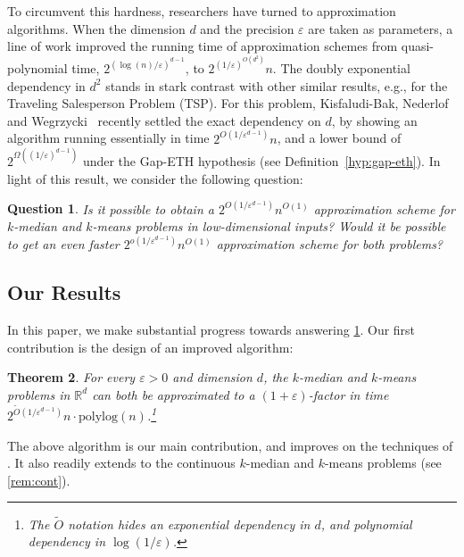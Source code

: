 \documentclass[11pt]{article}
\newtheorem{theorem}{Theorem}[section]
\newtheorem{question}[theorem]{Question}
\newcommand{\R}{\mathbb R}
\newcommand{\eps}{\varepsilon}
\newcommand{\polylog}{\mathrm{ polylog}}
\renewcommand{\tilde}{\widetilde}
\newcommand{\lpar}{\left(}
\newcommand{\rpar}{\right)}
\begin{document}
To circumvent this hardness, researchers have turned to approximation algorithms. When the dimension $d$ and the precision $\eps$ are taken as parameters, a line of work \cite{AroraRR98, KolliopoulosR07, FriggstadRS19, Cohen-AddadKM19, Cohen-Addad18, jacm} improved the running time of approximation schemes from quasi-polynomial time, $2^{(\log(n)/\eps)^{d-1}}$, to  $2^{(1/\eps)^{O(d^2)}} n$. 
The doubly exponential dependency in $d^2$ stands in stark contrast with other similar results, e.g., for the Traveling Salesperson Problem (TSP). 
For this problem, Kisfaludi-Bak, Nederlof and Wegrzycki~\cite{Kisfaludi-BakNW21} recently settled the exact dependency on $d$, by showing an algorithm running essentially in time $2^{O\lpar 1/\eps^{d-1}\rpar} n$, and a lower bound of $2^{\Omega\lpar (1/\eps)^{d-1}\rpar}$ under the Gap-ETH hypothesis \cite{D16,MR16} (see Definition~\ref{hyp:gap-eth}). 
In light of this result, we consider the following question:


\begin{question}\label{q:approx}
Is it possible to obtain a $2^{O\lpar 1/\eps^{d-1}\rpar} n^{O(1)}$ approximation scheme for $k$-median and $k$-means problems in low-dimensional inputs? Would it be possible to get an even faster $2^{o\lpar 1/\eps^{d-1}\rpar} n^{O(1)}$ approximation scheme for both problems?
\end{question}



\subsection{Our Results}
In this paper, we make substantial progress towards answering \cref{q:approx}. Our first contribution is the design of an improved algorithm:

\begin{theorem}\label{thm:mainAlgo}
    For every $\eps > 0$ and dimension $d$, the $k$-median and $k$-means problems in $\R^d$ can both be  approximated to a $(1+\eps)$-factor in time $2^{\tilde O\lpar 1/\eps^{d-1}\rpar} n \cdot \polylog(n)$.\footnote{The $\tilde O$ notation hides an exponential dependency in $d$, and polynomial dependency in $\log(1/\eps)$.}
\end{theorem}

The above algorithm is our main contribution, and improves on the techniques of \cite{jacm}. It also readily extends to the continuous $k$-median and $k$-means problems (see \cref{rem:cont}). 
\end{document}

